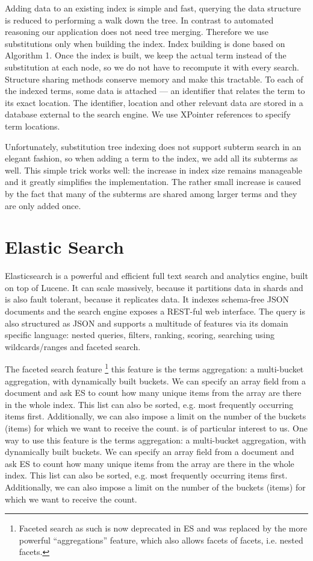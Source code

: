 \documentclass{deliverablereport}
\begin{document}
Adding data to an existing index is simple and fast, querying the data structure is
reduced to performing a walk down the tree. In contrast to automated reasoning our
application does not need tree merging. Therefore we use substitutions only when building
the index. Index building is done based on Algorithm 1. Once the index is built, we keep
the actual term instead of the substitution at each node, so we do not have to recompute
it with every search. Structure sharing methods conserve memory and make this
tractable. To each of the indexed terms, some data is attached — an identifier that
relates the term to its exact location. The identifier, location and other relevant data
are stored in a database external to the search engine. We use XPointer references to
specify term locations.

Unfortunately, substitution tree indexing does not support subterm search in an elegant
fashion, so when adding a term to the index, we add all its subterms as well. This simple
trick works well: the increase in index size remains manageable and it greatly simplifies
the implementation. The rather small increase is caused by the fact that many of the
subterms are shared among larger terms and they are only added once.

\section{Elastic Search}\label{sec:elastic}
Elasticsearch is a powerful and efficient full text search and analytics engine, built on
top of Lucene. It can scale massively, because it partitions data in shards and is also
fault tolerant, because it replicates data. It indexes schema-free JSON documents and the
search engine exposes a REST-ful web interface. The query is also structured as JSON and
supports a multitude of features via its domain specific language: nested queries,
filters, ranking, scoring, searching using wildcards/ranges and faceted search.

The faceted search feature \footnote{Faceted search as such is now deprecated in ES and
  was replaced by the more powerful “aggregations” feature, which also allows facets of
  facets, i.e. nested facets.} this feature is the terms aggregation: a multi-bucket
aggregation, with dynamically built buckets. We can specify an array field from a document
and ask ES to count how many unique items from the array are there in the whole
index. This list can also be sorted, e.g. most frequently occurring items
first. Additionally, we can also impose a limit on the number of the buckets (items) for
which we want to receive the count. is of particular interest to us. One way to use this
feature is the terms aggregation: a multi-bucket aggregation, with dynamically built
buckets. We can specify an array field from a document and ask ES to count how many unique
items from the array are there in the whole index. This list can also be sorted, e.g. most
frequently occurring items first. Additionally, we can also impose a limit on the number
of the buckets (items) for which we want to receive the count.
\end{document}
